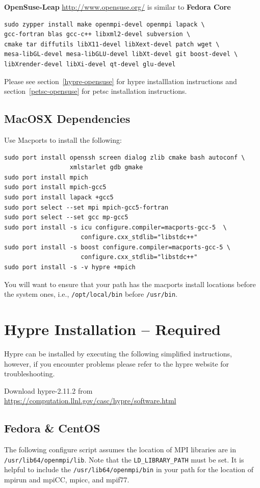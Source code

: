 \documentclass[12pt]{article}
\begin{document}
\textbf{OpenSuse-Leap} \url{http://www.opensuse.org/} is similar to
\textbf{Fedora Core}

\begin{verbatim}
sudo zypper install make openmpi-devel openmpi lapack \
gcc-fortran blas gcc-c++ libxml2-devel subversion \ 
cmake tar diffutils libX11-devel libXext-devel patch wget \
mesa-libGL-devel mesa-libGLU-devel libXt-devel git boost-devel \
libXrender-devel libXi-devel qt-devel glu-devel
\end{verbatim} 

Please see section~\ref{hypre-opensuse} for hypre installlation
instructions and section~\ref{petsc-opensuse} for petsc installation instructions.

\subsection{MacOSX  Dependencies}
Use Macports to install the following:

\begin{verbatim}
sudo port install openssh screen dialog zlib cmake bash autoconf \
                  xmlstarlet gdb gmake
sudo port install mpich
sudo port install mpich-gcc5
sudo port install lapack +gcc5
sudo port select --set mpi mpich-gcc5-fortran
sudo port select --set gcc mp-gcc5
sudo port install -s icu configure.compiler=macports-gcc-5  \
                     configure.cxx_stdlib="libstdc++"
sudo port install -s boost configure.compiler=macports-gcc-5 \
                     configure.cxx_stdlib="libstdc++"
sudo port install -s -v hypre +mpich
\end{verbatim}

You will want to ensure that your path has the macports install
locations before the system ones, i.e., \texttt{/opt/local/bin} before
\texttt{/usr/bin}.



\section{Hypre Installation -- Required}

Hypre can be installed by executing the following simplified
instructions, however, if you encounter problems please refer to the
hypre website for troubleshooting.

Download hypre-2.11.2 from
\url{https://computation.llnl.gov/casc/hypre/software.html}

\subsection{Fedora \& CentOS}
\label{hypre-fedora-centos}
The following configure script assumes the location of MPI libraries
are in \texttt{/usr/lib64/openmpi/lib}.  Note that the
\texttt{LD\_LIBRARY\_PATH} must be set.  It is helpful to include the
\texttt{/usr/lib64/openmpi/bin} in your path for the location of
mpirun and mpiCC, mpicc, and mpif77.
\end{document}
